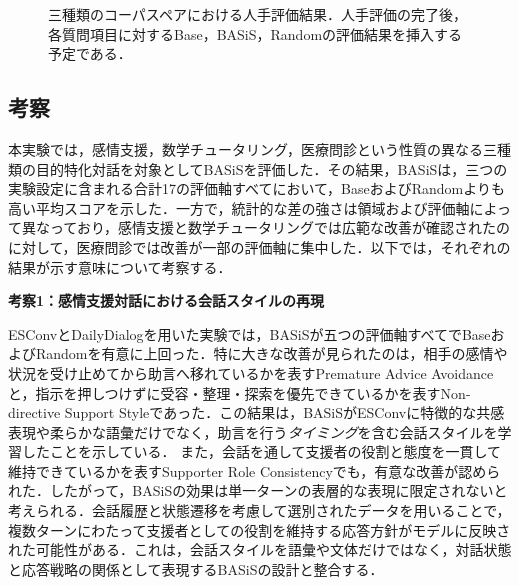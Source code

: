 \documentclass[manuscript,review,anonymous]{acmart}
\begin{document}
\begin{figure}[t]
  \centering
  \caption{三種類のコーパスペアにおける人手評価結果．人手評価の完了後，各質問項目に対するBase，BASiS，Randomの評価結果を挿入する予定である．}
  \label{fig:human_evaluation}
\end{figure}


\subsection{考察}
\label{sec:discussion}

本実験では，感情支援，数学チュータリング，医療問診という性質の異なる三種類の目的特化対話を対象としてBASiSを評価した．その結果，BASiSは，三つの実験設定に含まれる合計17の評価軸すべてにおいて，BaseおよびRandomよりも高い平均スコアを示した．一方で，統計的な差の強さは領域および評価軸によって異なっており，感情支援と数学チュータリングでは広範な改善が確認されたのに対して，医療問診では改善が一部の評価軸に集中した．以下では，それぞれの結果が示す意味について考察する．


\noindent\textbf{考察1：感情支援対話における会話スタイルの再現}\par
ESConvとDailyDialogを用いた実験では，BASiSが五つの評価軸すべてでBaseおよびRandomを有意に上回った．特に大きな改善が見られたのは，相手の感情や状況を受け止めてから助言へ移れているかを表すPremature Advice Avoidanceと，指示を押しつけずに受容・整理・探索を優先できているかを表すNon-directive Support Styleであった．この結果は，BASiSがESConvに特徴的な共感表現や柔らかな語彙だけでなく，助言を行う\emph{タイミング}を含む会話スタイルを学習したことを示している．
また，会話を通して支援者の役割と態度を一貫して維持できているかを表すSupporter Role Consistencyでも，有意な改善が認められた．したがって，BASiSの効果は単一ターンの表層的な表現に限定されないと考えられる．会話履歴と状態遷移を考慮して選別されたデータを用いることで，複数ターンにわたって支援者としての役割を維持する応答方針がモデルに反映された可能性がある．これは，会話スタイルを語彙や文体だけではなく，対話状態と応答戦略の関係として表現するBASiSの設計と整合する．
\end{document}
